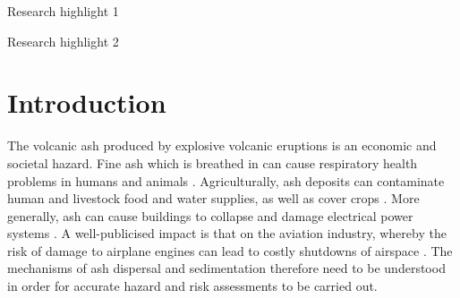\documentclass[authoryear,preprint,review,12pt]{elsarticle}
\begin{document}
\begin{frontmatter}
\begin{highlights}
\item Research highlight 1
\item Research highlight 2
\end{highlights}

\begin{keyword}



\end{keyword}

\end{frontmatter}


\section{Introduction}
\label{sec:intro}

The volcanic ash produced by explosive volcanic eruptions is an economic and societal hazard. Fine ash which is breathed in can cause respiratory health problems in humans and animals \citep{Kampa07, Anderson12, WHO13, Baxter15}. Agriculturally, ash deposits can contaminate human and livestock food and water supplies, as well as cover crops \citep{Cook81, Cronin98, Wilson11, Craig16}. More generally, ash can cause buildings to collapse and damage electrical power systems \citep{Wilson14, Craig16}. A well-publicised impact is that on the aviation industry, whereby the risk of damage to airplane engines can lead to costly shutdowns of airspace \citep{Budd11, Elissondo16}. The mechanisms of ash dispersal and sedimentation therefore need to be understood in order for accurate hazard and risk assessments to be carried out.
\end{document}

